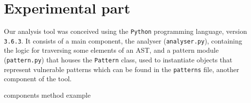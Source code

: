 \section*{Experimental part}
\label{sec:experimental}

Our analysis tool was conceived using the \verb|Python| programming language,
version \verb|3.6.3|. It consists of a main component, the analyser
(\verb|analyser.py|), containing the logic for traversing some elements of an
AST, and a pattern module (\verb|pattern.py|) that houses the \verb|Pattern|
class, used to instantiate objects that represent vulnerable patterns which can
be found in the \verb|patterns| file, another component of the tool.

{components}
{method}
{example}
